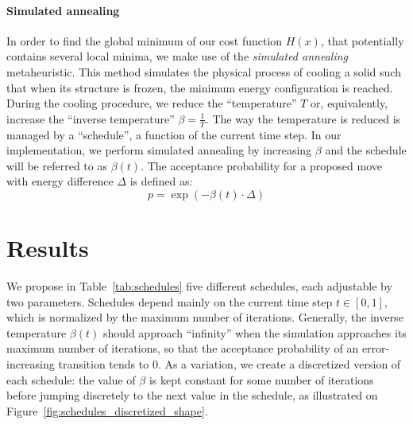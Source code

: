 \documentclass{article}
\begin{document}
  \paragraph{Simulated annealing}
  In order to find the global minimum of our cost function $H(x)$, that potentially contains several local minima, we make use of the \textit{simulated annealing} metaheuristic. This method simulates the physical process of cooling a solid such that when its structure is frozen, the minimum energy configuration is reached. During the cooling procedure, we reduce the ``temperature'' $T$ or, equivalently, increase the ``inverse temperature'' $\beta=\frac{1}{T}$. The way the temperature is reduced is managed by a ``schedule'', a function of the current time step. In our implementation, we perform simulated annealing by increasing $\beta$ and the schedule will be referred to as $\beta(t)$. The acceptance probability for a proposed move with energy difference $\Delta$ is defined as:
  \[
    p = \exp(- \beta(t) \cdot \Delta)
  \]

  \section*{Results}

  We propose in Table~\ref{tab:schedules} five different schedules, each adjustable by two parameters. Schedules depend mainly on the current time step $t \in [0, 1]$, which is normalized by the maximum number of iterations. Generally, the inverse temperature $\beta(t)$ should approach ``infinity'' when the simulation approaches its maximum number of iterations, so that the acceptance probability of an error-increasing transition tends to $0$. As a variation, we create a discretized version of each schedule: the value of $\beta$ is kept constant for some number of iterations before jumping discretely to the next value in the schedule, as illustrated on Figure~\ref{fig:schedules_discretized_shape}.
\end{document}

